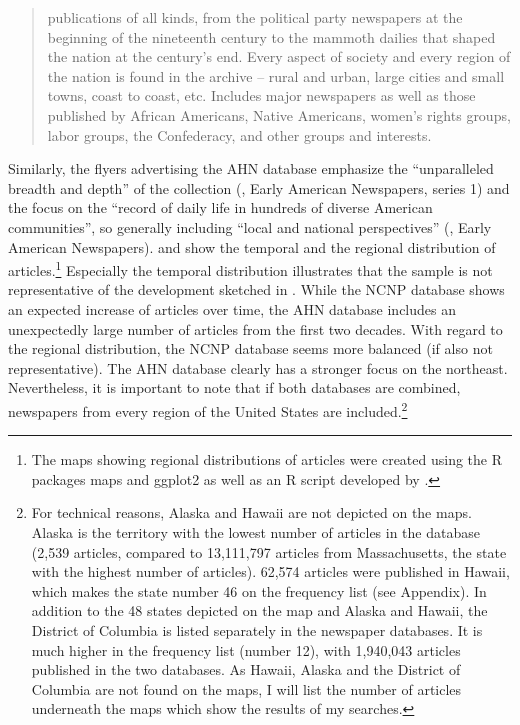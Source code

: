 \begin{quote}
publications of all kinds, from the political party newspapers at the beginning of the nineteenth century to the mammoth dailies that shaped the nation at the century's end. Every aspect of society and every region of the nation is found in the archive -- rural and urban, large cities and small towns, coast to coast, etc. Includes major newspapers as well as those published by African Americans, Native Americans, women's rights groups, labor groups, the Confederacy, and other groups and interests. \citep{Gale2018}
\end{quote}

Similarly, the flyers advertising the AHN database emphasize the “unparalleled breadth and depth” of the collection (\citeauthor{Readexnd}, Early American Newspapers, series 1) and the focus on the “record of daily life in hundreds of diverse American communities”, so generally including “local and national perspectives” (\citeauthor{Readexndb}, Early American Newspapers).  and  show the temporal and the regional distribution of articles.\footnote{The maps showing regional distributions of articles were created using the R packages maps \citep{Becker2016} and ggplot2 \citep{Wickham2009} as well as an R script developed by \citet{DeSante2012}.} Especially the temporal distribution illustrates that the sample is not representative of the development sketched in . While the NCNP database shows an expected increase of articles over time, the AHN database includes an unexpectedly large number of articles from the first two decades. With regard to the regional distribution, the NCNP database seems more balanced (if also not representative). The AHN database clearly has a stronger focus on the northeast. Nevertheless, it is important to note that if both databases are combined, newspapers from every region of the United States are included.\footnote{For technical reasons, Alaska and Hawaii are not depicted on the maps. Alaska is the territory with the lowest number of articles in the database (2,539 articles, compared to 13,111,797 articles from Massachusetts, the state with the highest number of articles). 62,574 articles were published in Hawaii, which makes the state number 46 on the frequency list (see Appendix). In addition to the 48 states depicted on the map and Alaska and Hawaii, the District of Columbia is listed separately in the newspaper databases. It is much higher in the frequency list (number 12), with 1,940,043 articles published in the two databases. As Hawaii, Alaska and the District of Columbia are not found on the maps, I will list the number of articles underneath the maps which show the results of my searches.}


